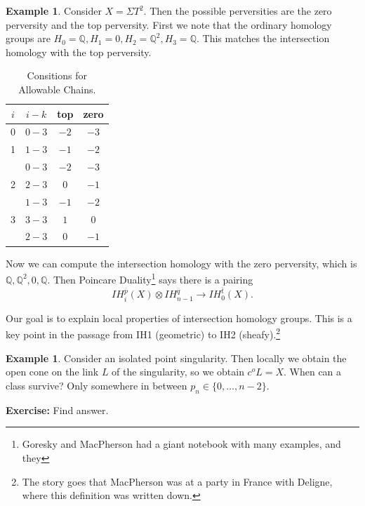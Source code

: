 \documentclass[leqno, openany]{memoir}
\theoremstyle{definition}
\newtheorem{exm}[thm]{Example}
\theoremstyle{remark}
\theoremstyle{plain}
\theoremstyle{definition}
\theoremstyle{remark}
\newcommand{\Q}{\mathbb{Q}}
\begin{document}
\begin{exm}
    Consider $X = \Sigma T^2$. Then the possible perversities are the zero perversity and the top perversity. First we note that the ordinary homology groups are $H_0 = \Q, H_1 = 0, H_2 = \Q^2, H_3 = \Q$. This matches the intersection homology with the top perversity.

    \begin{table}[H]
    \begin{center}
    \begin{tabular}{cccc}
        \toprule
        $i$ & $i-k$ & top  & zero \\
        \midrule
        $0$ & $0-3$ & $-2$ & $-3$ \\
        1   & $1-3$ & $-1$ & $-2$ \\
            & $0-3$ & $-2$ & $-3$ \\
        2   & $2-3$ & $0$  & $-1$ \\
            & $1-3$ & $-1$ & $-2$ \\
        3   & $3-3$ & $1$  & $0$  \\
            & $2-3$ & $0$  & $-1$ \\
        \bottomrule
    \end{tabular}
    \end{center}
    \caption{Consitions for Allowable Chains.}
    \end{table}
    Now we can compute the intersection homology with the zero perversity, which is $\Q, \Q^2, 0, \Q$. Then Poincare Duality\footnote{Goresky and MacPherson had a giant notebook with many examples, and they} says there is a pairing
    \[ IH_i^{\overline{p}}(X) \otimes IH_{n-1}^{\overline{q}} \to IH_0^{\overline{t}}(X). \]
\end{exm}

Our goal is to explain local properties of intersection homology groups. This is a key point in the passage from IH1 (geometric) to IH2 (sheafy).\footnote{The story goes that MacPherson was at a party in France with Deligne, where this definition was written down.}

\begin{exm}
    Consider an isolated point singularity. Then locally we obtain the open cone on the link $L$ of the singularity, so we obtain $c^oL = X$. When can a class survive? Only somewhere in between $p_n \in \{0, \ldots, n-2 \}$.

    \textbf{Exercise:} Find answer.
\end{exm}
\end{document}
